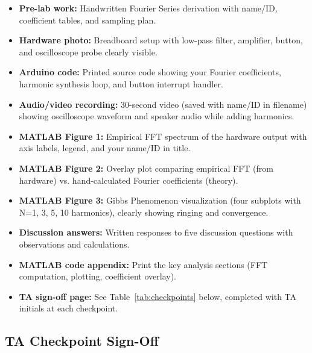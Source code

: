 \documentclass[11pt,letterpaper]{article}
\begin{document}
\begin{itemize}
    \item[$\square$] \textbf{Pre-lab work:} Handwritten Fourier Series derivation with name/ID, coefficient tables, and sampling plan.

    \item[$\square$] \textbf{Hardware photo:} Breadboard setup with low-pass filter, amplifier, button, and oscilloscope probe clearly visible.

    \item[$\square$] \textbf{Arduino code:} Printed source code showing your Fourier coefficients, harmonic synthesis loop, and button interrupt handler.

    \item[$\square$] \textbf{Audio/video recording:} 30-second video (saved with name/ID in filename) showing oscilloscope waveform and speaker audio while adding harmonics.

    \item[$\square$] \textbf{MATLAB Figure 1:} Empirical FFT spectrum of the hardware output with axis labels, legend, and your name/ID in title.

    \item[$\square$] \textbf{MATLAB Figure 2:} Overlay plot comparing empirical FFT (from hardware) vs. hand-calculated Fourier coefficients (theory).

    \item[$\square$] \textbf{MATLAB Figure 3:} Gibbs Phenomenon visualization (four subplots with N=1, 3, 5, 10 harmonics), clearly showing ringing and convergence.

    \item[$\square$] \textbf{Discussion answers:} Written responses to five discussion questions with observations and calculations.

    \item[$\square$] \textbf{MATLAB code appendix:} Print the key analysis sections (FFT computation, plotting, coefficient overlay).

    \item[$\square$] \textbf{TA sign-off page:} See Table~\ref{tab:checkpoints} below, completed with TA initials at each checkpoint.
\end{itemize}

\subsection{TA Checkpoint Sign-Off}
\end{document}
